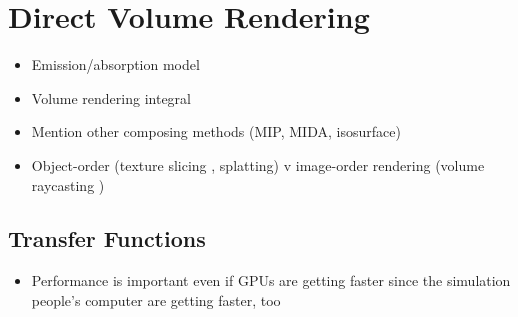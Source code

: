 \section{Direct Volume Rendering}
\begin{itemize}
    \item Emission/absorption model \cite{sabella1988rendering}
    \item Volume rendering integral \cite{max1995optical}
    \item Mention other composing methods (MIP, MIDA, isosurface)
    \item Object-order (texture slicing \cite{westermann1998efficiently}, splatting\cite{westover1990footprint}) v image-order rendering (volume raycasting \cite{levoy1988display})
\end{itemize}

\subsection{Transfer Functions}



\begin{itemize}
\item Performance is important even if GPUs are getting faster since the simulation people's computer are getting faster, too
\end{itemize}
